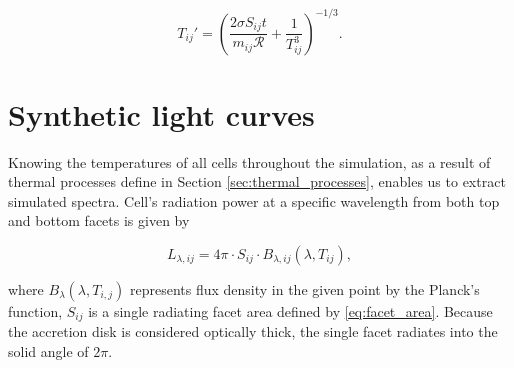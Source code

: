     \begin{equation}
    T_{ij}' = \left( \frac{2 \sigma S_{ij} t}{m_{ij} \mathcal{R}} + \frac{1}{T_{ij}^3} \right)^{-1/3}.
    \end{equation}

\section{Synthetic light curves}
    Knowing the temperatures of all cells throughout the simulation, as a result of thermal processes define in Section \ref{sec:thermal_processes}, enables us to extract simulated spectra. Cell's radiation power at a specific wavelength from both top and bottom facets is given by

    \begin{equation}
        L_{\lambda,ij} = 4\pi \cdot S_{ij} \cdot B_{\lambda,ij}(\lambda, T_{ij}),
        \label{eq:facet_radiation}
    \end{equation}

    where $B_{\lambda}(\lambda, T_{i,j})$ represents flux density in the given point by the Planck's function, $S_{ij}$ is a single radiating facet area defined by \eqref{eq:facet_area}. Because the accretion disk is considered optically thick, the single facet radiates into the solid angle of $2\pi$. 



